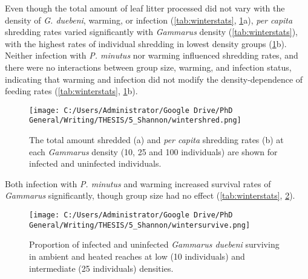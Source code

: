 Even though the total amount of leaf litter processed did not vary with the density of \emph{G. duebeni}, warming, or infection (\ref{tab:winterstats}, \ref{fig:wintershred}a), \emph{per capita} shredding rates varied significantly with \emph{Gammarus} density (\ref{tab:winterstats}), with the highest rates of individual shredding in lowest density groups (\ref{fig:wintershred}b). Neither infection with \emph{P. minutus} nor warming influenced shredding rates, and there were no interactions between group size, warming, and infection status, indicating that warming and infection did not modify the density-dependence of feeding rates (\ref{tab:winterstats}, \ref{fig:wintershred}b).  

\begin{figure}%
    \centering
    \texttt{[image: C:/Users/Administrator/Google Drive/PhD General/Writing/THESIS/5\_Shannon/wintershred.png]}
  \caption [Shredding by \emph{G. duebeni} at ambient and warmed temperatures in the field.]{The total amount shredded (a) and \emph{per capita} shredding rates (b) at each \emph{Gammarus} density (10, 25 and 100 individuals) are shown for infected and uninfected individuals.} 
    \label{fig:wintershred}
\end{figure}

Both infection with \emph{P. minutus} and warming increased survival rates of \emph{Gammarus} significantly, though group size had no effect (\ref{tab:winterstats}, \ref{fig:wintersurvive}).

\begin{figure}%
    \centering
    \texttt{[image: C:/Users/Administrator/Google Drive/PhD General/Writing/THESIS/5\_Shannon/wintersurvive.png]}
  \caption [Survival of \emph{G. duebeni} in ambient and warmed reaches in the field.]{Proportion of infected and uninfected \emph{Gammarus duebeni} surviving in ambient and heated reaches at low (10 individuals) and intermediate (25 individuals) densities.} 
    \label{fig:wintersurvive}
\end{figure}

